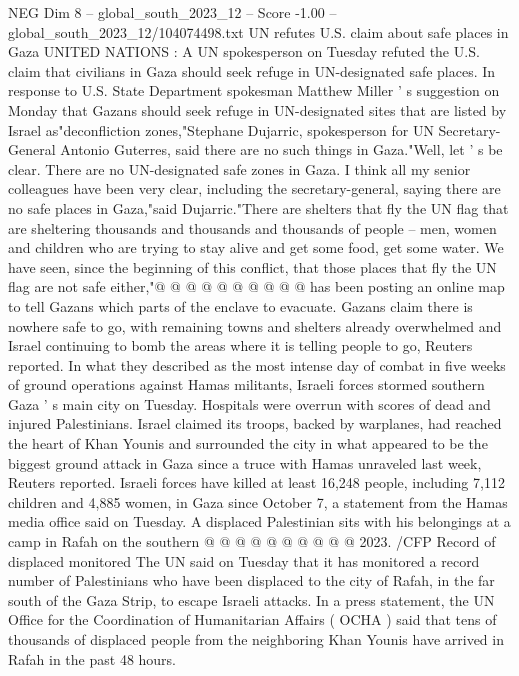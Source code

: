 \begin{textsample}{NEG Dim 8 – global\_south\_2023\_12 – Score -1.00 – global\_south\_2023\_12/104074498.txt}  \label{ex:f8_neg_221}
UN refutes U.S. claim about safe places in Gaza UNITED NATIONS : A UN spokesperson on Tuesday refuted the U.S. claim that civilians in Gaza should seek refuge in UN-designated safe places.
In response to U.S.
State Department spokesman Matthew Miller ' s suggestion on Monday that Gazans should seek refuge in UN-designated sites that are listed by Israel as"deconfliction zones,"Stephane Dujarric, spokesperson for UN Secretary-General Antonio Guterres, said there are no such things in Gaza."Well, let ' s be clear.
There are no UN-designated safe zones in Gaza.
I think all my senior colleagues have been very clear, including the secretary-general, saying there are no safe places in Gaza,"said Dujarric."There are shelters that fly the UN flag that are sheltering thousands and thousands and thousands of people -- men, women and children who are trying to stay alive and get some food, get some water.
We have seen, since the beginning of this conflict, that those places that fly the UN flag are not safe either,"@ @ @ @ @ @ @ @ @ @ has been posting an online map to tell Gazans which parts of the enclave to evacuate.
Gazans claim there is nowhere safe to go, with remaining towns and shelters already overwhelmed and Israel continuing to bomb the areas where it is telling people to go, Reuters reported.
In what they described as the most intense day of combat in five weeks of ground operations against Hamas militants, Israeli forces stormed southern Gaza ' s main city on Tuesday.
Hospitals were overrun with scores of dead and injured Palestinians.
Israel claimed its troops, backed by warplanes, had reached the heart of Khan Younis and surrounded the city in what appeared to be the biggest ground attack in Gaza since a truce with Hamas unraveled last week, Reuters reported.
Israeli forces have killed at least 16,248 people, including 7,112 children and 4,885 women, in Gaza since October 7, a statement from the Hamas media office said on Tuesday.
A displaced Palestinian sits with his belongings at a camp in Rafah on the southern @ @ @ @ @ @ @ @ @ @ 2023. /CFP Record of displaced monitored The UN said on Tuesday that it has monitored a record number of Palestinians who have been displaced to the city of Rafah, in the far south of the Gaza Strip, to escape Israeli attacks.
In a press statement, the UN Office for the Coordination of Humanitarian Affairs ( OCHA ) said that tens of thousands of displaced people from the neighboring Khan Younis have arrived in Rafah in the past 48 hours.

\end{textsample}
